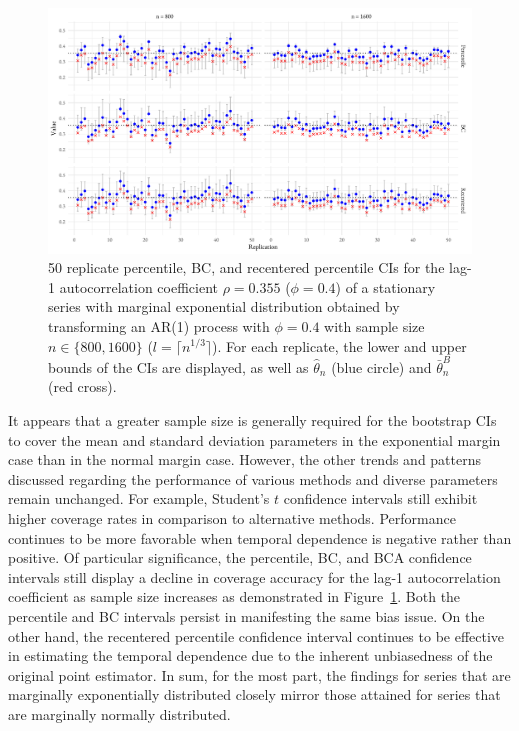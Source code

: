 \documentclass[10pt]{article}
\begin{document}
\begin{figure}[tbp]
  \centering
  \includegraphics[width=\textwidth]{figures/exp_phi_intervals}
  \caption{50 replicate percentile, BC, and recentered percentile CIs for the
    lag-1 autocorrelation coefficient $\rho = 0.355$ ($\phi = 0.4$)
    of a stationary series with marginal exponential distribution
    obtained by transforming an AR(1) process with $\phi = 0.4$ with
    sample size $n \in \{800, 1600\}$ ($l = \lceil n^{1/3} \rceil$). For 
    each replicate, the lower and upper bounds of the CIs are displayed, as well 
    as $\hat\theta_n$ (blue circle) and $\bar\theta_n^{B}$ (red cross).}
  \label{fig:eri}
\end{figure}


It appears that a greater sample size is generally required for the bootstrap
CIs to cover the mean and standard deviation parameters in the exponential
margin case than in the normal margin case. However, the other trends 
and patterns discussed regarding the performance of various methods and
diverse parameters remain unchanged. For example, Student's $t$ confidence
intervals still exhibit higher coverage rates in comparison to alternative
methods. Performance continues to be more favorable when temporal dependence is
negative rather than positive. Of particular significance, the percentile, BC,
and BCA confidence intervals still display a decline in coverage accuracy for
the lag-1 autocorrelation coefficient as sample size increases as demonstrated
in Figure~\ref{fig:eri}. Both the percentile and BC intervals persist in
manifesting the same bias issue. On the other hand, the recentered percentile
confidence interval continues to be effective in estimating the temporal 
dependence due to the
inherent unbiasedness of the original point estimator. In sum, 
for the most part, the findings for
series that are marginally exponentially distributed closely mirror those
attained for series that are marginally normally distributed.
\end{document}
